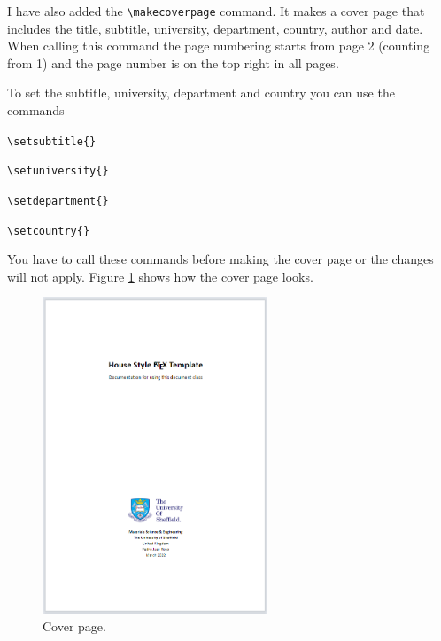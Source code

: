 \documentclass[headers1]{MSEHouseStyle}
\begin{document}
\noindent
I have also added the \verb|\makecoverpage| command. It makes a cover page that includes the title, subtitle, university, department, country, author and date. When calling this command the page numbering starts from page 2 (counting from 1) and the page number is on the top right in all pages. \par
To set the subtitle, university, department and country you can use the commands \par
\verb|\setsubtitle{}| \par
\verb|\setuniversity{}| \par
\verb|\setdepartment{}| \par
\verb|\setcountry{}| \par
\noindent
You have to call these commands before making the cover page or the changes will not apply. Figure \ref{fig:cover} shows how the cover page looks.

\begin{figure}[h]
    \centering
    \includegraphics[width=0.6\textwidth]{coverpage.png}
    \caption{Cover page.}
    \label{fig:cover}
\end{figure}

\printbibliography
\end{document}
